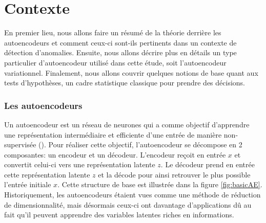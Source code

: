 \chapter{Contexte}     %
\label{chap:background}                   %

En premier lieu, nous allons faire un résumé de la théorie derrière les autoencodeurs et comment ceux-ci sont-ils pertinents dans un contexte de détection d'anomalies. Ensuite, nous allons décrire plus en détails un type particulier d'autoencodeur utilisé dans cette étude, soit l'autoencodeur variationnel. Finalement, nous allons couvrir quelques notions de base quant aux tests d'hypothèses, un cadre statistique classique pour prendre des décisions.

\subsection{Les autoencodeurs}

Un autoencodeur est un réseau de neurones qui a comme objectif d'apprendre une représentation intermédiaire et efficiente d'une entrée de manière non-supervisée (\cite{Goodfellow-et-al-2016}). Pour réaliser cette objectif, l'autoencodeur se décompose en 2 composantes: un encodeur et un décodeur. L'encodeur reçoit en entrée $x$ et convertit celui-ci vers une représentation latente $z$. Le décodeur prend en entrée cette représentation latente $z$ et la décode pour ainsi retrouver le plus possible l'entrée initiale $x$. Cette structure de base est illustrée dans la figure \ref{fig:basicAE}. Historiquement, les autoencodeurs étaient vues comme une méthode de réduction de dimensionnalité, mais désormais ceux-ci ont davantage d'applications dû au fait qu'il peuvent apprendre des variables latentes riches en informations. \newline


